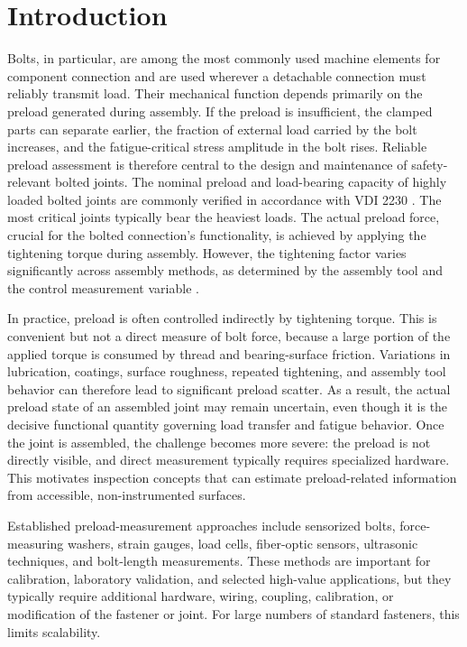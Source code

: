 \section{Introduction}
Bolts, in particular, are among the most commonly used machine elements for component connection \cite{ste12} and are used wherever a detachable connection must reliably transmit load. Their mechanical function depends primarily on the preload generated during assembly. If the preload is insufficient, the clamped parts can separate earlier, the fraction of external load carried by the bolt increases, and the fatigue-critical stress amplitude in the bolt rises. Reliable preload assessment is therefore central to the design and maintenance of safety-relevant bolted joints. 
The nominal preload and load-bearing capacity of highly loaded bolted joints are commonly verified in accordance with VDI 2230 \cite{vdi2230}. The most critical joints typically bear the heaviest loads. The actual preload force, crucial for the bolted connection’s functionality, is achieved by applying the tightening torque during assembly. However, the tightening factor varies significantly across assembly methods, as determined by the assembly tool and the control measurement variable \cite{wie07}.

In practice, preload is often controlled indirectly by tightening torque. This is convenient but not a direct measure of bolt force, because a large portion of the applied torque is consumed by thread and bearing-surface friction\cite{vdi2230}. Variations in lubrication, coatings, surface roughness, repeated tightening, and assembly tool behavior can therefore lead to significant preload scatter. As a result, the actual preload state of an assembled joint may remain uncertain, even though it is the decisive functional quantity governing load transfer and fatigue behavior. Once the joint is assembled, the challenge becomes more severe: the preload is not directly visible, and direct measurement typically requires specialized hardware. This motivates inspection concepts that can estimate preload-related information from accessible, non-instrumented surfaces.

Established preload-measurement approaches include sensorized bolts, force-measuring washers, strain gauges, load cells, fiber-optic sensors, ultrasonic techniques, and bolt-length measurements. These methods are important for calibration, laboratory validation, and selected high-value applications, but they typically require additional hardware, wiring, coupling, calibration, or modification of the fastener or joint. For large numbers of standard fasteners, this limits scalability.

